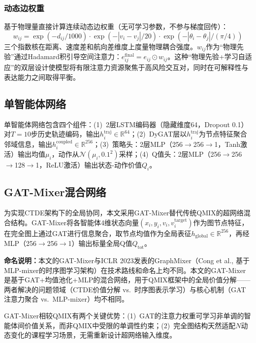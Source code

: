\documentclass[12pt,a4paper,UTF8]{ctexart}
\begin{document}
\subsubsection{动态边权重}

基于物理量直接计算连续动态边权重（无可学习参数，不参与梯度回传）：
\begin{equation}
    w_{ij} = \exp(-d_{ij}/1000) \cdot \exp(-|v_i - v_j|/20) \cdot \exp(-|\theta_i - \theta_j|/(\pi/4))
\end{equation}
三个指数核在距离、速度差和航向差维度上度量物理耦合强度。$w_{ij}$作为``物理先验''通过Hadamard积引导空间注意力：$e_{ij}^{\text{final}} = e_{ij} \odot w_{ij}$。这种``物理先验+学习自适应''的双层设计使模型将有限注意力资源聚焦于高风险交互对，同时在可解释性与表达能力之间取得平衡。

\subsection{单智能体网络}

单智能体网络包含四个组件：(1)~2层LSTM编码器（隐藏维度64，Dropout 0.1）对$T=10$步历史轨迹编码，输出$h_i^{\text{traj}} \in \mathbb{R}^{64}$；(2)~DyGAT层以$h_i^{\text{traj}}$为节点特征聚合邻域信息，输出$h_i^{\text{coupled}} \in \mathbb{R}^{256}$；(3)~策略头：2层MLP（256$\to$256$\to$1，Tanh激活）输出均值$\mu_i$，动作从$\mathcal{N}(\mu_i, 0.1^2)$采样；(4)~Q值头：2层MLP（256$\to$256$\to$128$\to$1，ReLU激活）输出状态-动作价值$Q_i$。

\subsection{GAT-Mixer混合网络}

为实现CTDE架构下的全局协同，本文采用GAT-Mixer替代传统QMIX的超网络混合结构\cite{ref11}。GAT-Mixer将各智能体4维状态向量$(x_i, y_i, v_i, v_i^{\text{target}})$作为图节点特征，在完全图上通过GAT进行信息聚合，取节点均值作为全局表征$h_{\text{global}} \in \mathbb{R}^{256}$，再经MLP（256$\to$256$\to$1）输出标量全局Q值$Q_{\text{tot}}$。

\textbf{命名说明：}本文的GAT-Mixer与ICLR 2023发表的GraphMixer（Cong et al., 基于MLP-mixer的时序图学习架构）\cite{ref25}在技术路线和命名上均不同。本文的GAT-Mixer是基于GAT+均值池化+MLP的混合网络，用于QMIX框架中的全局价值分解——两者解决的问题领域（CTDE价值分解 vs.\ 时序图表示学习）与核心机制（GAT注意力聚合 vs.\ MLP-mixer）均不相同。

GAT-Mixer相较QMIX有两个关键优势：(1)~GAT的注意力权重可学习非单调的智能体间价值关系，而非QMIX中受限的单调性约束；(2)~完全图结构天然适配$N$动态变化的课程学习场景，无需重新设计超网络输入维度。
\end{document}
